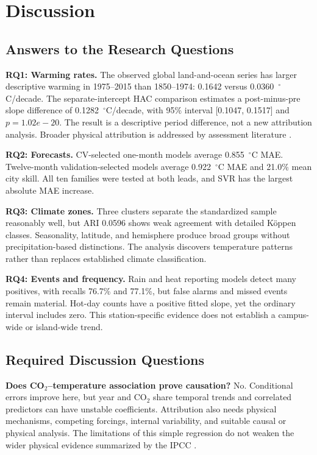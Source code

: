 \documentclass[conference]{IEEEtran}
\begin{document}
\FloatBarrier
\section{Discussion}
\subsection{Answers to the Research Questions}
\textbf{RQ1: Warming rates.} The observed global land-and-ocean series has larger descriptive warming in 1975--2015 than 1850--1974: 0.1642 versus 0.0360~$^\circ$C/decade. The separate-intercept HAC comparison estimates a post-minus-pre slope difference of 0.1282~$^\circ$C/decade, with 95\% interval [0.1047, 0.1517] and $p=1.02e-20$. The result is a descriptive period difference, not a new attribution analysis. Broader physical attribution is addressed by assessment literature \cite{ipcc2023}.

\textbf{RQ2: Forecasts.} CV-selected one-month models average 0.855~$^\circ$C MAE. Twelve-month validation-selected models average 0.922~$^\circ$C MAE and 21.0\% mean city skill. All ten families were tested at both leads, and SVR has the largest absolute MAE increase.

\textbf{RQ3: Climate zones.} Three clusters separate the standardized sample reasonably well, but ARI 0.0596 shows weak agreement with detailed K\"oppen classes. Seasonality, latitude, and hemisphere produce broad groups without precipitation-based distinctions. The analysis discovers temperature patterns rather than replaces established climate classification.

\textbf{RQ4: Events and frequency.} Rain and heat reporting models detect many positives, with recalls 76.7\% and 77.1\%, but false alarms and missed events remain material. Hot-day counts have a positive fitted slope, yet the ordinary interval includes zero. This station-specific evidence does not establish a campus-wide or island-wide trend.

\subsection{Required Discussion Questions}
\textbf{Does CO$_2$--temperature association prove causation?} No. Conditional errors improve here, but year and CO$_2$ share temporal trends and correlated predictors can have unstable coefficients. Attribution also needs physical mechanisms, competing forcings, internal variability, and suitable causal or physical analysis. The limitations of this simple regression do not weaken the wider physical evidence summarized by the IPCC \cite{ipcc2023}.
\end{document}

